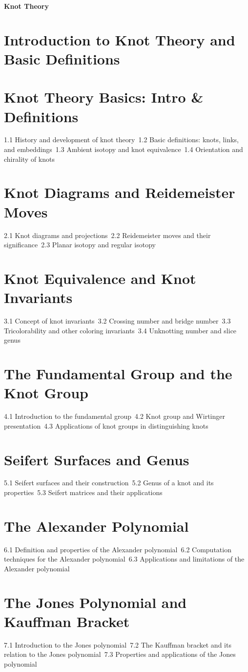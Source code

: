{\LARGE \bf{Knot Theory}}
\section{Introduction to Knot Theory and Basic Definitions}
\section{Knot Theory Basics: Intro \& Definitions}
1.1 History and development of knot theory\
1.2 Basic definitions: knots, links, and embeddings\
1.3 Ambient isotopy and knot equivalence\
1.4 Orientation and chirality of knots\
\section{Knot Diagrams and Reidemeister Moves}
2.1 Knot diagrams and projections\
2.2 Reidemeister moves and their significance\
2.3 Planar isotopy and regular isotopy\
\section{Knot Equivalence and Knot Invariants}
3.1 Concept of knot invariants\
3.2 Crossing number and bridge number\
3.3 Tricolorability and other coloring invariants\
3.4 Unknotting number and slice genus\
\section{The Fundamental Group and the Knot Group}
4.1 Introduction to the fundamental group\
4.2 Knot group and Wirtinger presentation\
4.3 Applications of knot groups in distinguishing knots\
\section{Seifert Surfaces and Genus}
5.1 Seifert surfaces and their construction\
5.2 Genus of a knot and its properties\
5.3 Seifert matrices and their applications\
\section{The Alexander Polynomial}
6.1 Definition and properties of the Alexander polynomial\
6.2 Computation techniques for the Alexander polynomial\
6.3 Applications and limitations of the Alexander polynomial\
\section{The Jones Polynomial and Kauffman Bracket}
7.1 Introduction to the Jones polynomial\
7.2 The Kauffman bracket and its relation to the Jones polynomial\
7.3 Properties and applications of the Jones polynomial\
